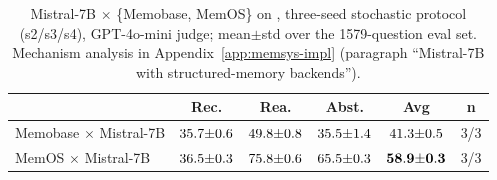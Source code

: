 \begin{table}[h]
\centering
\small
\caption{Mistral-7B $\times$ \{Memobase, MemOS\} on \benchL, three-seed stochastic protocol (s2/s3/s4), GPT-4o-mini judge; mean$\pm$std over the 1579-question eval set. Mechanism analysis in Appendix~\ref{app:memsys-impl} (paragraph ``Mistral-7B with structured-memory backends'').}
\label{tab:mistral-structured}
\begin{tabular}{lccccc}
\toprule
 & Rec. & Rea. & Abst. & Avg & n \\
\midrule
Memobase $\times$ Mistral-7B  & $35.7{\scriptsize\pm0.6}$ & $49.8{\scriptsize\pm0.8}$ & $35.5{\scriptsize\pm1.4}$ & $41.3{\scriptsize\pm0.5}$ & 3/3 \\
MemOS $\times$ Mistral-7B     & $36.5{\scriptsize\pm0.3}$ & $75.8{\scriptsize\pm0.6}$ & $65.5{\scriptsize\pm0.3}$ & $\mathbf{58.9{\scriptsize\pm0.3}}$ & 3/3 \\
\bottomrule
\end{tabular}
\end{table}
